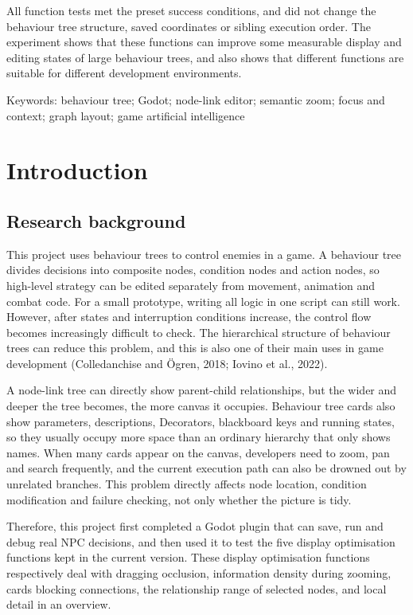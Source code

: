 \documentclass[11pt,a4paper,oneside,extrafontsizes]{memoir}
\begin{document}
All function tests met the preset success conditions, and did not change the behaviour tree structure, saved coordinates or sibling execution order. The experiment shows that these functions can improve some measurable display and editing states of large behaviour trees, and also shows that different functions are suitable for different development environments.

Keywords: behaviour tree; Godot; node-link editor; semantic zoom; focus and context; graph layout; game artificial intelligence

\mainmatter

\chapter{Introduction}

\section{Research background}

This project uses behaviour trees to control enemies in a game. A behaviour tree divides decisions into composite nodes, condition nodes and action nodes, so high-level strategy can be edited separately from movement, animation and combat code. For a small prototype, writing all logic in one script can still work. However, after states and interruption conditions increase, the control flow becomes increasingly difficult to check. The hierarchical structure of behaviour trees can reduce this problem, and this is also one of their main uses in game development (Colledanchise and Ögren, 2018; Iovino et al., 2022).

A node-link tree can directly show parent-child relationships, but the wider and deeper the tree becomes, the more canvas it occupies. Behaviour tree cards also show parameters, descriptions, Decorators, blackboard keys and running states, so they usually occupy more space than an ordinary hierarchy that only shows names. When many cards appear on the canvas, developers need to zoom, pan and search frequently, and the current execution path can also be drowned out by unrelated branches. This problem directly affects node location, condition modification and failure checking, not only whether the picture is tidy.

Therefore, this project first completed a Godot plugin that can save, run and debug real NPC decisions, and then used it to test the five display optimisation functions kept in the current version. These display optimisation functions respectively deal with dragging occlusion, information density during zooming, cards blocking connections, the relationship range of selected nodes, and local detail in an overview.
\end{document}
